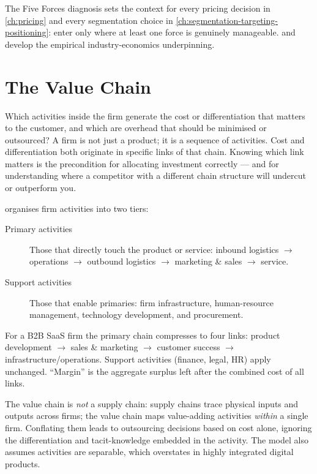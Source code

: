 The Five Forces diagnosis sets the context for every pricing decision in
\cref{ch:pricing} and every segmentation choice in
\cref{ch:segmentation-targeting-positioning}: enter only where at least one force is
genuinely manageable. \textcite{porter1980} and \textcite{dranove7theconomics} develop the
empirical industry-economics underpinning.

\section{The Value Chain}\label{sec:value-chain}

Which activities inside the firm generate the cost or differentiation that matters to the
customer, and which are overhead that should be minimised or outsourced? A firm is not just
a product; it is a sequence of activities. Cost and differentiation both originate in specific
links of that chain. Knowing which link matters is the precondition for allocating investment
correctly --- and for understanding where a competitor with a different chain structure will
undercut or outperform you.

\textcite{porter1985} organises firm activities into two tiers:
\begin{description}
  \item[Primary activities] Those that directly touch the product or service:
    inbound logistics $\to$ operations $\to$ outbound logistics $\to$
    marketing \& sales $\to$ service.
  \item[Support activities] Those that enable primaries: firm infrastructure,
    human-resource management, technology development, and procurement.
\end{description}
For a B2B SaaS firm the primary chain compresses to four links:
product development $\to$ sales \& marketing $\to$ customer success $\to$
infrastructure/operations. Support activities (finance, legal, HR) apply unchanged.
``Margin'' is the aggregate surplus left after the combined cost of all links.

The value chain is \emph{not} a supply chain: supply chains trace physical inputs and
outputs across firms; the value chain maps value-adding activities \emph{within} a single
firm. Conflating them leads to outsourcing decisions based on cost alone, ignoring the
differentiation and tacit-knowledge embedded in the activity. The model also assumes
activities are separable, which overstates in highly integrated digital products.


